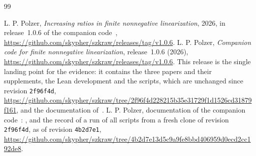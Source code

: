 \begin{thebibliography}{99}

 L. P. Polzer, \emph{Increasing ratios in finite nonnegative linearization}, 2026, in release~1.0.6 of the companion code~\cite{code}, \url{https://github.com/skypher/szkraw/releases/tag/v1.0.6}.
 L. P. Polzer, \emph{Companion code for finite nonnegative linearization}, release~1.0.6 (2026), \url{https://github.com/skypher/szkraw/releases/tag/v1.0.6}. This release is the single landing point for the evidence: it contains the three papers and their supplements, the Lean development and the scripts, which are unchanged since revision \texttt{2f96f4d}, \url{https://github.com/skypher/szkraw/tree/2f96f4d228215b35e31729f1d1526cd31879f161}, and the documentation of~\cite{docs}.
 L. P. Polzer, documentation of the companion code~\cite{code}: ,  and the record  of a run of all scripts from a fresh clone of revision \texttt{2f96f4d}, as of revision \texttt{4b2d7e1}, \url{https://github.com/skypher/szkraw/tree/4b2d7e13d5c9a9fe8bbd406959d0ecd2cc192de8}.
\end{thebibliography}

